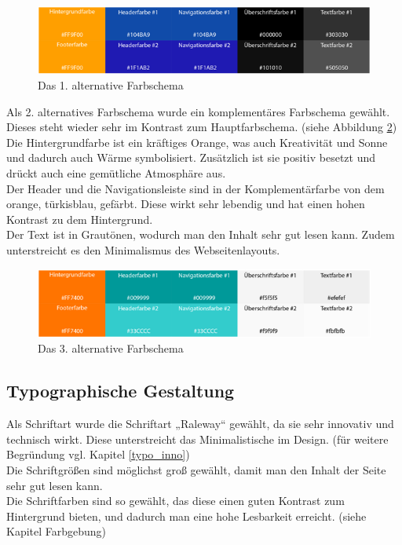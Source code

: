 \begin{figure} [hp]
\includegraphics[width=\textwidth]{./img/mini_farb2.png}
\caption{Das 1. alternative Farbschema }
\label{mini_farb2}
\end{figure}

Als 2. alternatives Farbschema wurde ein komplementäres Farbschema gewählt. Dieses steht wieder sehr im Kontrast zum Hauptfarbschema. (siehe Abbildung \ref{mini_farb3})
\\
Die Hintergrundfarbe ist ein kräftiges Orange, was auch Kreativität und Sonne und dadurch auch Wärme symbolisiert. Zusätzlich ist sie positiv besetzt und drückt auch eine gemütliche Atmosphäre aus.
\\
Der Header und die Navigationsleiste sind in der Komplementärfarbe von dem orange, türkisblau,  gefärbt. Diese wirkt sehr lebendig und hat einen hohen Kontrast zu dem Hintergrund.
\\
Der Text ist in Grautönen, wodurch man den Inhalt sehr gut lesen kann. Zudem unterstreicht es den Minimalismus des Webseitenlayouts.

\begin{figure} [hp]
\includegraphics[width=\textwidth]{./img/mini_farb3.png}
\caption{Das 3. alternative Farbschema }
\label{mini_farb3}
\end{figure}

	\subsection{Typographische Gestaltung}\label{chapter:mini:typo}

Als Schriftart wurde die Schriftart „Raleway“ gewählt, da sie sehr innovativ und technisch wirkt. Diese unterstreicht das Minimalistische im Design. (für weitere Begründung vgl. Kapitel \ref{typo_inno})
\\
Die Schriftgrößen sind möglichst groß gewählt, damit man den Inhalt der Seite sehr gut lesen kann.
\\
Die Schriftfarben sind so gewählt, das diese einen guten Kontrast zum Hintergrund bieten, und dadurch man eine hohe Lesbarkeit erreicht. (siehe Kapitel Farbgebung)


